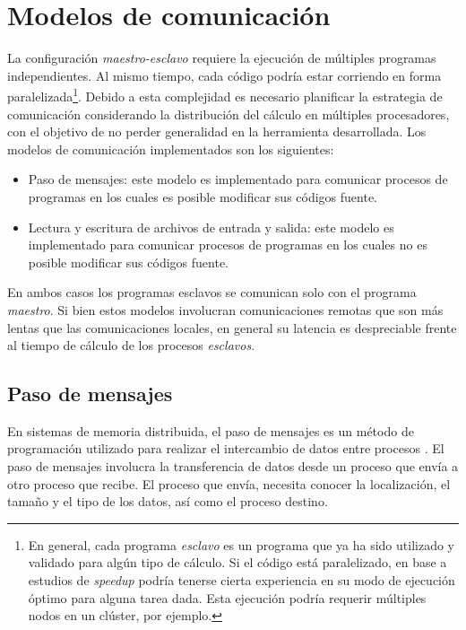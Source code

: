 \section{Modelos de comunicación}
\label{2:comunicacion}

La configuración \textit{maestro-esclavo} requiere la ejecución de múltiples programas independientes.
Al mismo tiempo, cada código podría estar corriendo en forma paralelizada\footnote{
En general, cada programa \textit{esclavo} es un programa que ya ha sido utilizado y validado para algún tipo de cálculo.
Si el código está paralelizado, en base a estudios de \textit{speedup} podría tenerse cierta experiencia en su modo de ejecución óptimo para alguna tarea dada.
Esta ejecución podría requerir múltiples nodos en un clúster, por ejemplo.
}.
Debido a esta complejidad es necesario planificar la estrategia de comunicación considerando la distribución del cálculo en múltiples procesadores,
con el objetivo de no perder generalidad en la herramienta desarrollada.
Los modelos de comunicación implementados son los siguientes:
\begin{itemize}
\item Paso de mensajes: este modelo es implementado para comunicar procesos de programas en los cuales es posible modificar sus códigos fuente.
\item Lectura y escritura de archivos de entrada y salida: este modelo es implementado para comunicar procesos de programas en los cuales no es posible modificar sus códigos fuente.
\end{itemize}

En ambos casos los programas esclavos se comunican solo con el programa \textit{maestro}.
Si bien estos modelos involucran comunicaciones remotas que son más lentas que las
comunicaciones locales, en general su latencia es despreciable frente al tiempo de cálculo de los procesos \textit{esclavos}.

\subsection*{Paso de mensajes}
\label{2:mpi}

En sistemas de memoria distribuida, el paso de mensajes es un método de
programación utilizado para realizar el intercambio de datos entre
procesos \cite{comunicacion}. 
El paso de mensajes involucra la transferencia de datos desde un proceso
que envía a otro proceso que recibe. 
El proceso que envía,
necesita conocer la localización, el tamaño y el tipo de los datos, así como el
proceso destino.


